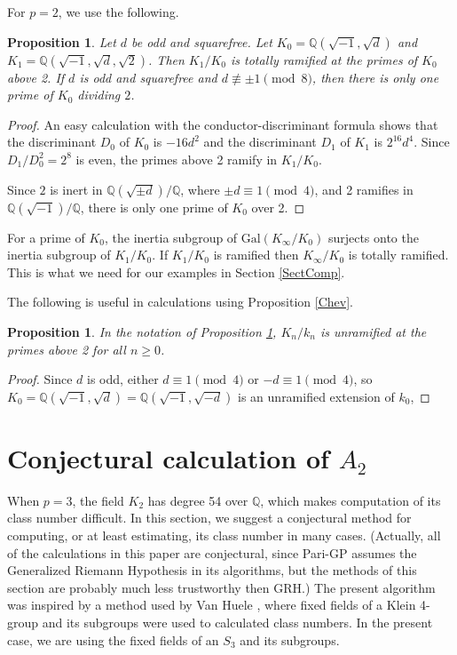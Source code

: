 \documentclass{amsart}
\newtheorem{proposition}[theorem]{Proposition}
\begin{document}
For $p=2$, we use the following.
\begin{proposition}\label{totram2}
Let $d$ be odd and squarefree. Let $K_0=\mathbb Q(\sqrt{-1}, \sqrt{d})$ and $K_1=\mathbb Q(\sqrt{-1}, \sqrt{d}, \sqrt{2})$.
Then $K_1/K_0$ is totally ramified at the primes of $K_0$ above 2.
If $d$ is odd and squarefree and $d\not
\equiv \pm 1 \pmod 8$, then there is only one prime of $K_0$ dividing $2$.
\end{proposition}
\begin{proof}  An easy calculation with the conductor-discriminant formula shows that
the discriminant $D_0$ of $K_0$ is $-16d^2$ and the discriminant $D_1$ of $K_1$ is $2^{16}d^4$.
Since $D_1/D_0^2= 2^8$ is even, the primes above 2 ramify in $K_1/K_0$.

Since $2$ is inert in $\mathbb Q(\sqrt{\pm d})/\mathbb Q$, where $\pm d\equiv 1\pmod 4$,
and 2 ramifies in $\mathbb Q(\sqrt{-1})/\mathbb Q$,
there is only one prime of $K_0$ over 2.
\end{proof}

For a prime of $K_0$, the inertia subgroup of $\text{Gal}(K_{\infty}/K_0)$ surjects onto the inertia subgroup of $K_1/K_0$.
If $K_1/K_0$ is ramified then $K_{\infty}/K_0$ is totally ramified. This is what we need for our examples in Section \ref{SectComp}.

The following is useful in calculations using Proposition \ref{Chev}.
\begin{proposition}\label{unram2} In the notation of Proposition \ref{totram2}, $K_n/k_n$ is unramified at the primes above 2 for all $n\ge 0$.
\end{proposition}
\begin{proof} Since $d$ is odd, either $d\equiv 1\pmod 4$ or $-d\equiv 1\pmod 4$,
so $K_0=\mathbb Q(\sqrt{-1}, \sqrt{d})=\mathbb Q(\sqrt{-1}, \sqrt{-d})$ is an unramified extension of $k_0$, \end{proof} 

\section{Conjectural calculation of $A_2$}\label{conj}

When $p=3$, the field $K_2$ has degree 54 over $\mathbb Q$, which makes computation of its class number
difficult. In this section, we suggest a conjectural method for computing, or at least estimating, its class number
in many cases. (Actually, all of the calculations in this paper are conjectural, since Pari-GP assumes the Generalized Riemann
Hypothesis in its algorithms, but the methods of this section are probably much less trustworthy then GRH.)
The present algorithm was inspired by a method used by Van Huele \cite{VH}, where fixed fields of a Klein 4-group and its subgroups
were used to calculated class numbers. In the present case, we are using the fixed fields of an $S_3$ and its subgroups.
\end{document}
